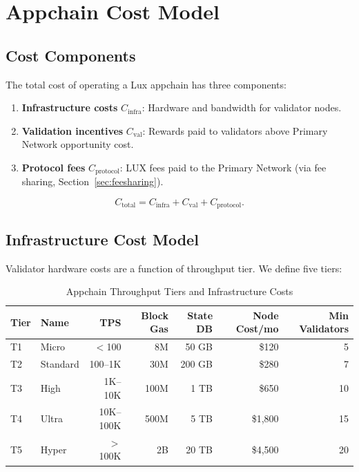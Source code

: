 \section{Appchain Cost Model}

\label{sec:costs}

\subsection{Cost Components}

The total cost of operating a Lux appchain has three components:

\begin{enumerate}[leftmargin=1.5em]
  \item \textbf{Infrastructure costs} $C_{\text{infra}}$: Hardware and bandwidth for
    validator nodes.
  \item \textbf{Validation incentives} $C_{\text{val}}$: Rewards paid to validators
    above Primary Network opportunity cost.
  \item \textbf{Protocol fees} $C_{\text{protocol}}$: LUX fees paid to the Primary Network
    (via fee sharing, Section~\ref{sec:feesharing}).
\end{enumerate}

\[
  C_{\text{total}} = C_{\text{infra}} + C_{\text{val}} + C_{\text{protocol}}.
\]

\subsection{Infrastructure Cost Model}

Validator hardware costs are a function of throughput tier. We define five tiers:

\begin{table}[H]
\centering
\caption{Appchain Throughput Tiers and Infrastructure Costs}
\label{tab:tiers}
\begin{tabular}{llrrrrr}
\toprule
\textbf{Tier} & \textbf{Name} & \textbf{TPS} & \textbf{Block Gas} & \textbf{State DB} & \textbf{Node Cost/mo} & \textbf{Min Validators} \\
\midrule
T1 & Micro & $<$100 & 8M & 50 GB & \$120 & 5 \\
T2 & Standard & 100--1K & 30M & 200 GB & \$280 & 7 \\
T3 & High & 1K--10K & 100M & 1 TB & \$650 & 10 \\
T4 & Ultra & 10K--100K & 500M & 5 TB & \$1,800 & 15 \\
T5 & Hyper & $>$100K & 2B & 20 TB & \$4,500 & 20 \\
\bottomrule
\end{tabular}
\end{table}

